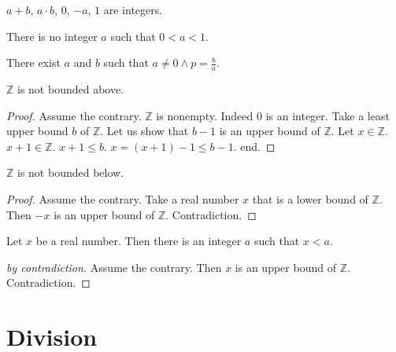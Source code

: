 \documentclass{article}
\begin{document}
\begin{forthel}

\begin{axiom}
$a + b$, $a \cdot b$, $0$, $-a$, $1$ are integers.
\end{axiom}

\begin{axiom}
There is no integer $a$ such that $0 < a < 1$.
\end{axiom}

\begin{axiom}
There exist $a$ and $b$ such that
$a \neq 0 \wedge p = \frac{b}{a}$.
\end{axiom}

\begin{theorem}[Archimedes1]
$\mathbb{Z}$ is not bounded above.
\end{theorem}
\begin{proof}
Assume the contrary.
$\mathbb{Z}$ is nonempty. Indeed $0$ is an integer.
Take a least upper bound
$b$ of $\mathbb{Z}$.
Let us show that $b - 1$ is an upper bound of $\mathbb{Z}$.
Let $x \in \mathbb{Z}$. $x + 1 \in \mathbb{Z}$.
$x + 1 \leq b$.
$x = (x + 1) - 1 \leq b - 1$.
end.
\end{proof}

\begin{theorem}
$\mathbb{Z}$ is not bounded below.
\end{theorem}
\begin{proof}
Assume the contrary.
Take a real number $x$ that is a lower bound of $\mathbb{Z}$.
Then $-x$ is an upper bound of $\mathbb{Z}$.
Contradiction.
\end{proof}

\begin{theorem}[Archimedes2]
Let $x$ be a real number.
Then there is an integer $a$
such that $x < a$.\end{theorem}
\begin{proof}[by contradiction]
Assume the contrary.
Then $x$ is an upper bound of $\mathbb{Z}$.
Contradiction.
\end{proof}


\end{forthel}


\section{Division}
\end{document}
